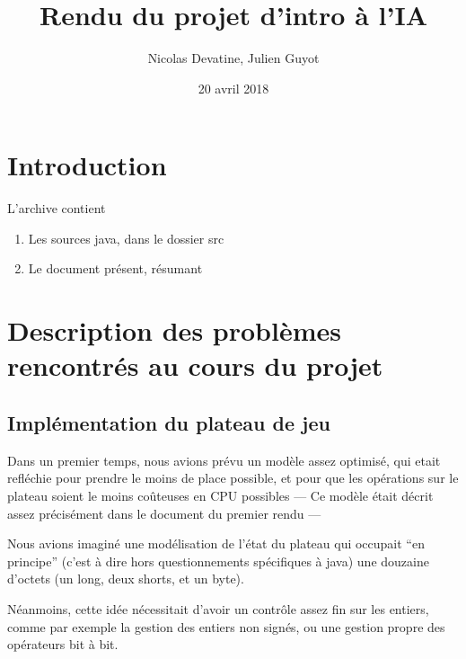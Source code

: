 \documentclass{article}
\author{Nicolas Devatine, Julien Guyot}
\title{Rendu du projet d'intro à l'IA}
\date{20 avril 2018}
\begin{document}
\maketitle
\section{Introduction}

L'archive contient
\begin{enumerate}
\item Les sources java, dans le dossier src
\item Le document présent, résumant 
\end{enumerate}

\section{Description des problèmes rencontrés au cours du projet}
\subsection{Implémentation du plateau de jeu}
Dans un premier temps, nous avions prévu un modèle assez
optimisé, qui etait refléchie pour prendre le moins de place possible,
et pour que les opérations sur le plateau soient le moins coûteuses en
CPU possibles --- Ce modèle était décrit assez précisément dans le
document du premier rendu ---


Nous avions imaginé une modélisation de l'état du plateau qui occupait
``en principe'' (c'est à dire hors questionnements spécifiques à java)
une douzaine d'octets (un long, deux shorts, et un byte). 


Néanmoins, cette idée nécessitait d'avoir un contrôle assez fin sur les
entiers, comme par exemple la gestion des entiers non signés, ou une
gestion propre des opérateurs bit à bit.
\end{document}
